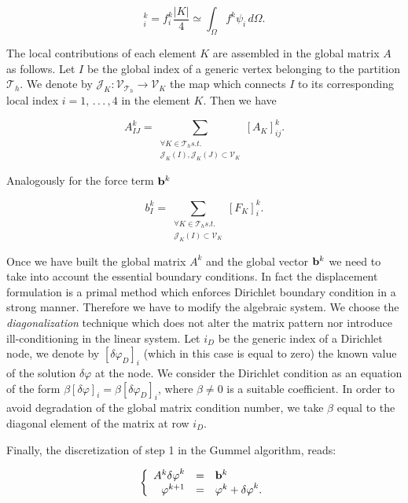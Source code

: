 \begin{equation}
[F_K]_i^k =  f^k_i \frac{|K|}{4} \simeq \int_{\Omega} f^k \psi_i \, d\Omega .
\end{equation}

The local contributions of each element $K$ are assembled in the global matrix $A$ as follows. Let $I$ be the global index of a generic vertex belonging to the partition $\mathcal{T}_h$. We denote by $\mathcal{J}_K: \mathcal{V}_{\mathcal{T}_h} \rightarrow \mathcal{V}_{K}$ the map which connects $I$ to its corresponding local index $i=1, \, . \, . \, . \, , 4$ in the element $K$. Then we have 

\begin{equation}
A_{IJ}^k = \sum_{\substack{\forall K \in \mathcal{T}_h s.t. \\ \mathcal{J}_K(I),\mathcal{J}_K(J) \subset \mathcal{V}_K}}
 [A_K]_{ij}^k.
\end{equation}

Analogously for the force term $\mathbf{b}^{k}$

\begin{equation}
b_{I}^k = \sum_{\substack{\forall K \in \mathcal{T}_h s.t. \\ \mathcal{J}_K(I) \subset \mathcal{V}_K}}
 [F_K]_{i}^k.
\end{equation}

Once we have built the global matrix $A^k$ and the global vector $\mathbf{b}^k$ we need to take into account the essential boundary conditions. In fact the displacement formulation is a primal method which enforces Dirichlet boundary condition in a strong manner. Therefore we have to modify the algebraic system. We choose the \textit{diagonalization} technique which does not alter the matrix pattern nor introduce ill-conditioning in the linear system.  Let $i_D$ be the generic index of a Dirichlet node, we denote by $[\delta \varphi_{D}]_i$ (which in this case is equal to zero) the known value of the solution $\delta \varphi $ at the node. We consider the Dirichlet condition as an equation of the form $\beta [\delta \varphi]_i = \beta [\delta \varphi_{D}]_i$, where $\beta \neq 0$ is a suitable coefficient. In order to avoid degradation of the global matrix condition number, we take $\beta$ equal to the diagonal element of the matrix at row  $i_D$.

Finally, the discretization of step 1 in the Gummel algorithm, reads:

\begin{equation}
\label{eq: NLP discretizated}
\left\{
\begin{array}{rcl}
A^k\mathbf{\delta \varphi}^k & = & \mathbf{b}^k \\
\mathbf{\varphi}^{k+1} & = & \mathbf{\varphi}^k +  \mathbf{\delta \varphi}^k . 
\end{array}
\right.
\end{equation}

